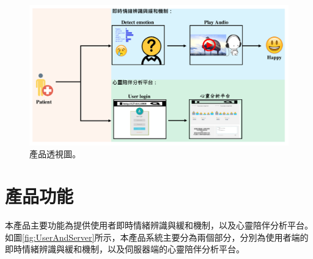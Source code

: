 \documentclass[12pt]{scrreprt}
\begin{document}
\begin{figure}[!h]
\begin{center}
\includegraphics[width=.85\textwidth]{./figs/diagrams/tracy.pdf}
\end{center}
\vspace{-0.9cm}
\caption{產品透視圖。}
\label{fig:tracy}
\end{figure}


\newpage
\section{產品功能} %
本產品主要功能為提供使用者即時情緒辨識與緩和機制，以及心靈陪伴分析平台。如圖\ref{fig:UserAndServer}所示，本產品系統主要分為兩個部分，分別為使用者端的即時情緒辨識與緩和機制，以及伺服器端的心靈陪伴分析平台。
\end{document}

